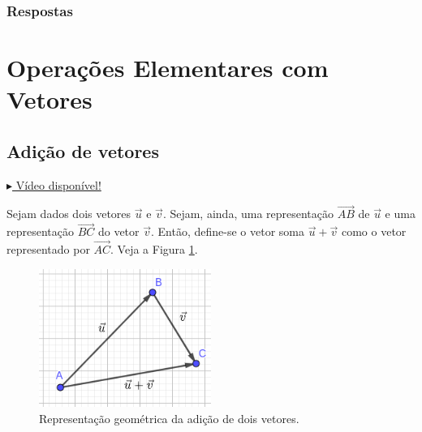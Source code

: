 \ifisbook
\subsubsection{Respostas}
\shipoutAnswer
\fi


\section{Operações Elementares com Vetores}
\badgeRevisar

\subsection{Adição de vetores}

\begin{flushright}
  \href{https://archive.org/details/adicao-de-vetores}{$\blacktriangleright$ Vídeo disponível!}
\end{flushright}

Sejam dados dois vetores $\vec{u}$ e $\vec{v}$. Sejam, ainda, uma representação $\overrightarrow{AB}$ de $\vec{u}$ e uma representação $\overrightarrow{BC}$ do vetor $\vec{v}$. Então, define-se o vetor soma $\vec{u}+\vec{v}$ como o vetor representado por $\overrightarrow{AC}$. Veja a Figura \ref{fig:vadicao}.

\begin{figure}[H]
  \centering
  \includegraphics[width=0.5\textwidth]{./cap_vetor/dados/fig_vadicao/fig_vadicao}
  \caption{Representação geométrica da adição de dois vetores.}
  \label{fig:vadicao}
\end{figure}

